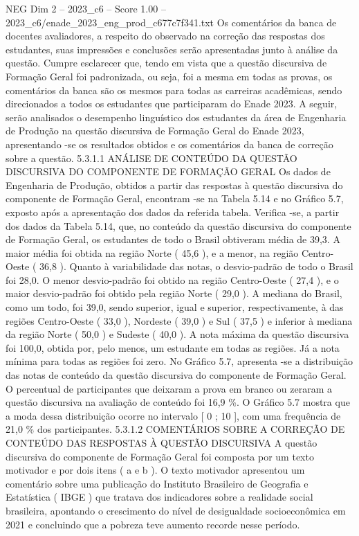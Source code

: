 \begin{textsample}{NEG Dim 2 – 2023\_c6 – Score 1.00 – 2023\_c6/enade\_2023\_eng\_prod\_c677c7f341.txt}
Os comentários da banca de docentes avaliadores, a respeito do observado na correção das respostas dos estudantes, suas impressões e conclusões serão apresentadas junto à análise da questão.
Cumpre esclarecer que, tendo em vista que a questão discursiva de Formação Geral foi padronizada, ou seja, foi a mesma em todas as provas, os comentários da banca são os mesmos para todas as carreiras acadêmicas, sendo direcionados a todos os estudantes que participaram do Enade 2023.
A seguir, serão analisados o desempenho linguístico dos estudantes da área de Engenharia de Produção na questão discursiva de Formação Geral do Enade 2023, apresentando -se os resultados obtidos e os comentários da banca de correção sobre a questão. 5.3.1.1 ANÁLISE DE CONTEÚDO DA QUESTÃO DISCURSIVA DO COMPONENTE DE FORMAÇÃO GERAL Os dados de Engenharia de Produção, obtidos a partir das respostas à questão discursiva do componente de Formação Geral, encontram -se na Tabela 5.14 e no Gráfico 5.7, exposto após a apresentação dos dados da referida tabela.
Verifica -se, a partir dos dados da Tabela 5.14, que, no conteúdo da questão discursiva do componente de Formação Geral, os estudantes de todo o Brasil obtiveram média de 39,3.
A maior média foi obtida na região Norte ( 45,6 ), e a menor, na região Centro-Oeste ( 36,8 ).
Quanto à variabilidade das notas, o desvio-padrão de todo o Brasil foi 28,0.
O menor desvio-padrão foi obtido na região Centro-Oeste ( 27,4 ), e o maior desvio-padrão foi obtido pela região Norte ( 29,0 ).
A mediana do Brasil, como um todo, foi 39,0, sendo superior, igual e superior, respectivamente, à das regiões Centro-Oeste ( 33,0 ), Nordeste ( 39,0 ) e Sul ( 37,5 ) e inferior à mediana da região Norte ( 50,0 ) e Sudeste ( 40,0 ).
A nota máxima da questão discursiva foi 100,0, obtida por, pelo menos, um estudante em todas as regiões.
Já a nota mínima para todas as regiões foi zero.
No Gráfico 5.7, apresenta -se a distribuição das notas de conteúdo da questão discursiva do componente de Formação Geral.
O percentual de participantes que deixaram a prova em branco ou zeraram a questão discursiva na avaliação de conteúdo foi 16,9 \%.
O Gráfico 5.7 mostra que a moda dessa distribuição ocorre no intervalo [ 0 ; 10 ], com uma frequência de 21,0 \% dos participantes. 5.3.1.2 COMENTÁRIOS SOBRE A CORREÇÃO DE CONTEÚDO DAS RESPOSTAS À QUESTÃO DISCURSIVA A questão discursiva do componente de Formação Geral foi composta por um texto motivador e por dois itens ( a e b ).
O texto motivador apresentou um comentário sobre uma publicação do Instituto Brasileiro de Geografia e Estatística ( IBGE ) que tratava dos indicadores sobre a realidade social brasileira, apontando o crescimento do nível de desigualdade socioeconômica em 2021 e concluindo que a pobreza teve aumento recorde nesse período.

\end{textsample}
